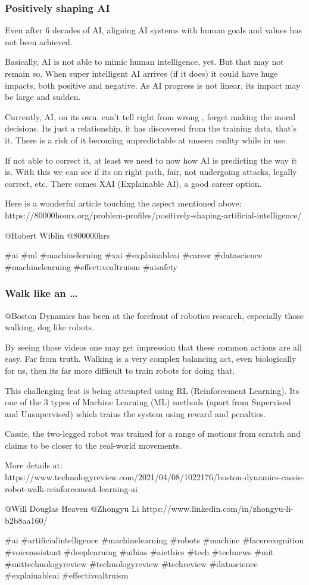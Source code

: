 \begin{frame}[fragile]\frametitle{Positively shaping AI}
Even after 6 decades of AI, aligning AI systems with human goals and values has not been achieved. 

Basically, AI is not able to mimic human intelligence, yet. But that may not remain so. When super intelligent AI arrives (if it does)  it could have huge impacts, both positive and negative. As AI progress is not linear, its impact may be large and sudden.

Currently, AI, on its own, can’t tell right from wrong , forget making the moral decisions. Its just a relationship, it has discovered from the training data, that's it.  There is a risk of it becoming unpredictable at unseen reality while in use.

If not able to correct it, at least we need to now how AI is predicting the way it is. With this we can see if its on right path, fair, not undergoing attacks, legally correct, etc. There comes XAI (Explainable AI), a good career option.

Here is a wonderful article touching the aspect mentioned above: 
https://80000hours.org/problem-profiles/positively-shaping-artificial-intelligence/

@Robert Wiblin @800000hrs

\#ai \#ml \#machinelerning \#xai \#explainableai \#career \#datascience
\#machinelearning \#effectivealtruism \#aisafety
\end{frame}

\begin{frame}[fragile]\frametitle{Walk like an \ldots}
@Boston Dynamics has been at the forefront of robotics research, especially those walking, dog like robots. 

By seeing those videos one may get impression that these common actions are all easy. Far from truth. Walking is a very complex balancing act, even biologically for us, then its far more difficult to train robots for doing that.

This challenging feat is being attempted using RL (Reinforcement Learning). Its one of the 3 types of Machine Learning (ML) methods (apart from Supervised and Unsupervised) which trains the system using reward and penalties.

Cassie, the two-legged robot was trained for a range of motions from scratch and claims to be closer to the real-world movements.

More details at: https://www.technologyreview.com/2021/04/08/1022176/boston-dynamics-cassie-robot-walk-reinforcement-learning-ai

@Will Douglas Heaven @Zhongyu Li https://www.linkedin.com/in/zhongyu-li-b2b8aa160/

\#ai \#artificialintelligence \#machinelearning \#robots \#machine \#facerecognition \#voiceassistant \#deeplearning \#aibias \#aiethics \#tech \#technews \#mit \#mittechnologyreview \#technologyreview \#techreview 
\#datascience \#explainableai \#effectivealtruism 

\end{frame}

